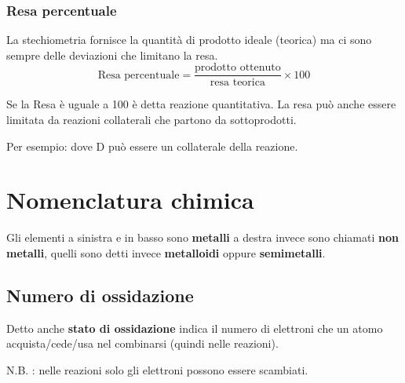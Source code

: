 \subsubsection{Resa percentuale}
La stechiometria fornisce la quantità di prodotto ideale (teorica) ma ci sono sempre delle deviazioni che limitano la resa. \[\text{Resa percentuale} = \frac{\text{prodotto ottenuto}}{\text{resa teorica}}\times 100\]


Se la Resa è uguale a 100 è detta reazione quantitativa.
La resa può anche essere limitata da reazioni collaterali che partono da sottoprodotti. 

Per esempio:  dove D può essere un collaterale della reazione. 

\section{Nomenclatura chimica}
Gli elementi a sinistra e in basso sono \textbf{metalli} a destra invece sono chiamati \textbf{non metalli}, quelli sono detti invece \textbf{metalloidi} oppure \textbf{semimetalli}.

\subsection{Numero di ossidazione}
Detto anche \textbf{stato di ossidazione} indica il numero di elettroni che un atomo acquista/cede/usa nel combinarsi (quindi nelle reazioni). 

N.B. : nelle reazioni solo gli elettroni possono essere scambiati. 


